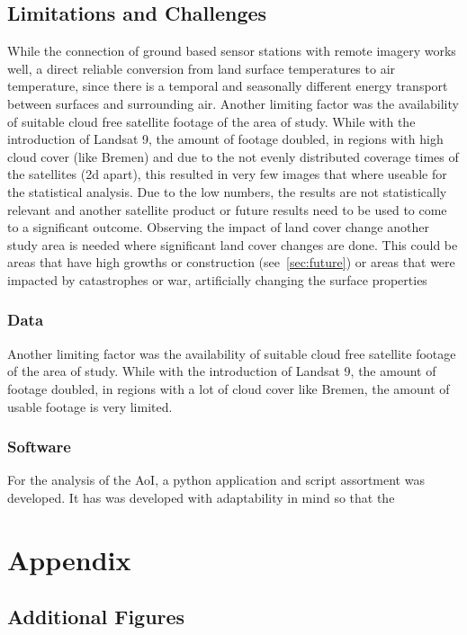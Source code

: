 \documentclass[12pt,a4paper, english,twoside]{scrartcl}
\begin{document}
\subsection{Limitations and Challenges}
  While the connection of ground based sensor stations with remote imagery works well, a direct reliable conversion from land surface temperatures to air temperature, since there is a temporal and seasonally different energy transport between surfaces and surrounding air. 
  Another limiting factor was the availability of suitable cloud free satellite footage of the area of study.
  While with the introduction of Landsat 9, the amount of footage doubled, in regions with high cloud cover (like Bremen) and due to the not evenly distributed coverage times of the satellites (2d apart), this resulted in very few images that where useable for the statistical analysis. 
  Due to the low numbers, the results are not statistically relevant and another satellite product or future results need to be used to come to a significant outcome. 
  Observing the impact of land cover change another study area is needed where significant land cover changes are done. 
  This could be areas that have high growths or construction (see~\cref{sec:future}) or areas that were impacted by catastrophes or war, artificially changing the surface properties 

\subsubsection{Data}
Another limiting factor was the availability of suitable cloud free satellite footage of the area of study.
While with the introduction of Landsat 9, the amount of footage doubled, in regions with a lot of cloud cover like Bremen, the amount of usable footage is very limited.

\subsubsection{Software}
For the analysis of the \gls{AoI}, a python application and script assortment was developed. 
It has was developed with adaptability in mind so that the 

\newpage
\section{Appendix}
  \subsection{Additional Figures}
  \missingfigure{}
\end{document}
